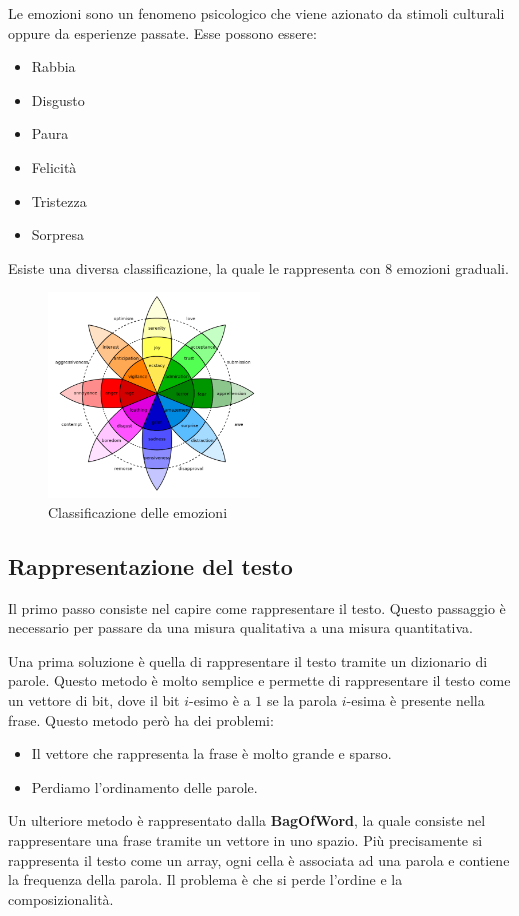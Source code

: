 \begin{definizione}
      Le emozioni sono un fenomeno psicologico che viene azionato da stimoli
      culturali oppure da esperienze passate. Esse possono essere:
      \begin{itemize}
            \item Rabbia
            \item Disgusto
            \item Paura
            \item Felicità
            \item Tristezza
            \item Sorpresa
      \end{itemize}
      Esiste una diversa classificazione, la quale le rappresenta con 8 emozioni
      graduali.
      \begin{figure}[!ht]
            \centering
            \includegraphics[width=0.5\textwidth]{./img/nlp/emozioni.png}
            \caption{Classificazione delle emozioni}
            \label{fig:emozioni}
      \end{figure}
\end{definizione}
\subsection{Rappresentazione del testo}
Il primo passo consiste nel capire come rappresentare il testo. Questo passaggio
è necessario per passare da una misura qualitativa a una misura quantitativa.

Una prima soluzione è quella di rappresentare il testo tramite un dizionario
di parole. Questo metodo è molto semplice e permette di rappresentare il testo
come un vettore di bit, dove il bit $i$-esimo è a $1$ se la parola $i$-esima
è presente nella frase. Questo metodo però ha dei problemi:
\begin{itemize}
      \item Il vettore che rappresenta la frase è molto grande e sparso.
      \item Perdiamo l'ordinamento delle parole.
\end{itemize}
Un ulteriore metodo è rappresentato dalla \textbf{BagOfWord}, la quale consiste
nel rappresentare una frase tramite un vettore in uno spazio. Più precisamente si
rappresenta il testo come un array, ogni cella è associata ad una parola 
e contiene la frequenza della parola. Il problema è che
si perde l'ordine e la composizionalità.


